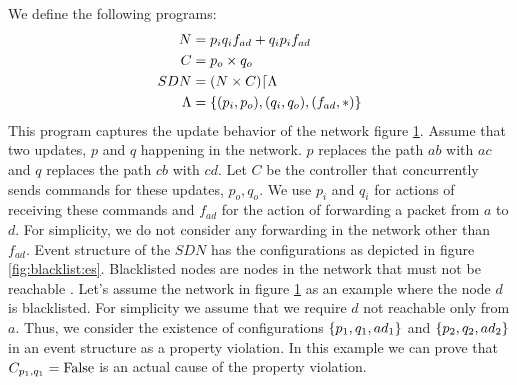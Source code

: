 \begin{example}
    \begin{figure}
        \centering
        \caption{}
        \label{fig:blacklist}
    \end{figure}
    We define the following programs:
    \begin{align*}
        N & = p_i q_i f_{ad} + q_i p_i f_{ad} \\
        C & = p_o \times q_o \\
        SDN & = (N \times C)\lceil \Lambda \\
        \Lambda & = \{(p_i,p_o),(q_i,q_o),(f_{ad},*)\}
    \end{align*}
    This program captures the update behavior of the network 
    figure \ref{fig:blacklist}.
    Assume that two updates, $p$ and $q$ happening in the network.
    $p$ replaces the path $ab$ with $ac$ and $q$ replaces
    the path $cb$ with $cd$.
    Let $C$ be the controller that concurrently sends commands for these
    updates, $p_o,q_o$.
    We use $p_i$ and $q_i$ for actions of receiving these commands and
    $f_{ad}$ for the action of forwarding a packet from $a$ to $d$.
    For simplicity, we do not consider any forwarding in the network 
    other than $f_{ad}$.
    Event structure of the $SDN$ has the configurations as depicted 
    in figure \ref{fig:blacklist:es}.
    Blacklisted nodes are nodes in the network that must not
    be reachable \cite{network-abstractions}.
    Let's assume the network in figure \ref{fig:blacklist} as
    an example where the node $d$ is blacklisted.
    For simplicity we assume that we require
    $d$ not reachable only from $a$.
    Thus, we consider the existence of configurations
    $\{p_1,q_1,ad_1\}$ and $\{p_2,q_2,ad_2\}$ in an event structure
    as a property violation.
    In this example we can prove that $C_{p_1,q_1} = \mathrm{False}$ is an 
    actual cause of the property violation.

\end{example}
